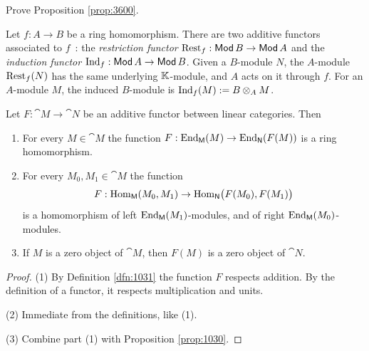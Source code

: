 \begin{exer} \label{exer:3601}
Prove Proposition \ref{prop:3600}.
\end{exer}

\begin{exa} \label{exa:4935}
Let $f : A \to B$ be a ring homomorphism. There are two additive functors 
associated to $f$~: the 
{\em restriction functor}%
$\operatorname{Rest}_f : \operatorname{\mathsf{Mod}} B \to  \operatorname{\mathsf{Mod}} A$
and the {\em induction functor}
$\operatorname{Ind}_f : \operatorname{\mathsf{Mod}} A \to  \operatorname{\mathsf{Mod}} B$.
Given a $B$-module $N$, the $A$-module $\operatorname{Rest}_f(N)$ has the 
same underlying $\mathbb{K}$-module, and $A$ acts on it through $f$.
For an $A$-module $M$, the induced $B$-module is 
$\operatorname{Ind}_f(M) := B \otimes_A M$.
\end{exa}

\begin{prop} \label{prop:109}
Let $F : \cat{M} \to \cat{N}$ be an additive functor between linear
categories. Then\tup{:}
\begin{enumerate}
\item For every $M \in \cat{M}$ the function 
$F : \operatorname{End}_{\operatorname{\mathsf{M}}}(M) \to \operatorname{End}_{\operatorname{\mathsf{N}}}(F(M))$
is a ring homomorphism.

\item For every $M_0, M_1\in \cat{M}$ the function 
\[ F : \operatorname{Hom}_{\operatorname{\mathsf{M}}}(M_0, M_1) \to 
\operatorname{Hom}_{\operatorname{\mathsf{N}}} \bigl( F(M_0), F(M_1) \bigr) \]
is a homomorphism of left $\operatorname{End}_{\operatorname{\mathsf{M}}}(M_1)$-modules, and of 
right $\operatorname{End}_{\operatorname{\mathsf{M}}}(M_0)$-modules.

\item If $M$ is a zero object of $\cat{M}$, then $F(M)$ is a 
zero object of $\cat{N}$.
\end{enumerate}
\end{prop}

\begin{proof} \mbox{}

\smallskip \noindent
(1) By Definition \ref{dfn:1031} the function $F$ respects addition. By the 
definition of a functor, it respects multiplication and units. 

\medskip \noindent 
(2) Immediate from the definitions, like (1). 

\medskip \noindent 
(3) Combine part (1) with Proposition \ref{prop:1030}.
\end{proof}

